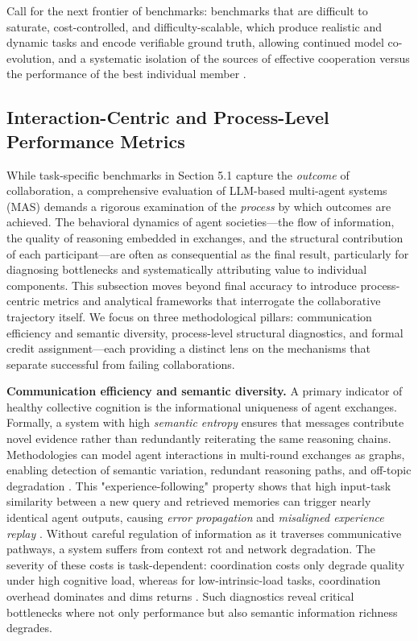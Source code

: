 \documentclass[11pt,a4paper]{article}
\begin{document}
Call for the next frontier of benchmarks: benchmarks that are difficult to saturate, cost-controlled, and difficulty-scalable, which produce realistic and dynamic tasks and encode verifiable ground truth, allowing continued model co-evolution, and a systematic isolation of the sources of effective cooperation versus the performance of the best individual member \cite{arxiv:2602.01011v4}.


\subsection{Interaction-Centric and Process-Level Performance Metrics}


While task-specific benchmarks in Section 5.1 capture the \emph{outcome} of collaboration, a comprehensive evaluation of LLM-based multi-agent systems (MAS) demands a rigorous examination of the \emph{process} by which outcomes are achieved. The behavioral dynamics of agent societies---the flow of information, the quality of reasoning embedded in exchanges, and the structural contribution of each participant---are often as consequential as the final result, particularly for diagnosing bottlenecks and systematically attributing value to individual components. This subsection moves beyond final accuracy to introduce process-centric metrics and analytical frameworks that interrogate the collaborative trajectory itself. We focus on three methodological pillars: communication efficiency and semantic diversity, process-level structural diagnostics, and formal credit assignment---each providing a distinct lens on the mechanisms that separate successful from failing collaborations.

\textbf{Communication efficiency and semantic diversity.} A primary indicator of healthy collective cognition is the informational uniqueness of agent exchanges. Formally, a system with high \emph{semantic entropy} ensures that messages contribute novel evidence rather than redundantly reiterating the same reasoning chains. Methodologies can model agent interactions in multi-round exchanges as graphs, enabling detection of semantic variation, redundant reasoning paths, and off-topic degradation \cite{arxiv:2410.02506v1}. This "experience-following" property shows that high input-task similarity between a new query and retrieved memories can trigger nearly identical agent outputs, causing \emph{error propagation} and \emph{misaligned experience replay} \cite{arxiv:2505.16067v2}. Without careful regulation of information as it traverses communicative pathways, a system suffers from context rot and network degradation. The severity of these costs is task-dependent: coordination costs only degrade quality under high cognitive load, whereas for low-intrinsic-load tasks, coordination overhead dominates and dims returns \cite{arxiv:2506.06843v3}. Such diagnostics reveal critical bottlenecks where not only performance but also semantic information richness degrades.
\end{document}
